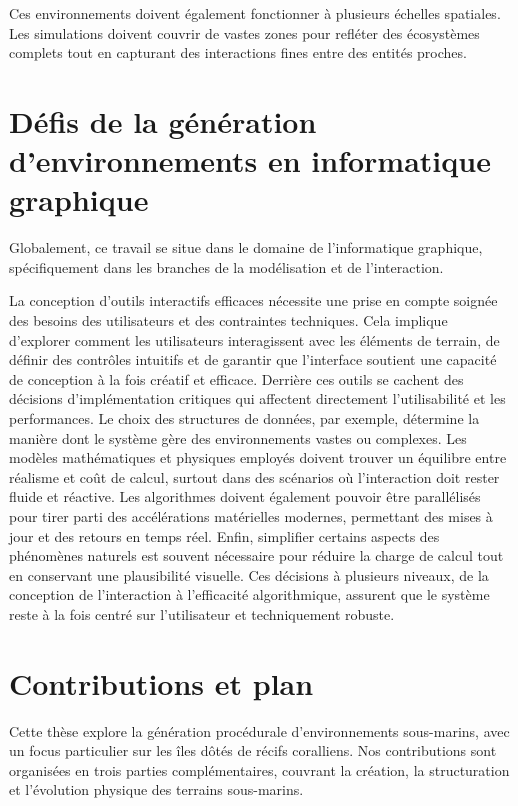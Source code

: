 Ces environnements doivent également fonctionner à plusieurs échelles spatiales. Les simulations doivent couvrir de vastes zones pour refléter des écosystèmes complets tout en capturant des interactions fines entre des entités proches.

\section*{Défis de la génération d'environnements en informatique graphique}

Globalement, ce travail se situe dans le domaine de l'informatique graphique, spécifiquement dans les branches de la modélisation et de l'interaction.

La conception d'outils interactifs efficaces nécessite une prise en compte soignée des besoins des utilisateurs et des contraintes techniques. Cela implique d'explorer comment les utilisateurs interagissent avec les éléments de terrain, de définir des contrôles intuitifs et de garantir que l'interface soutient une capacité de conception à la fois créatif et efficace. Derrière ces outils se cachent des décisions d'implémentation critiques qui affectent directement l'utilisabilité et les performances. Le choix des structures de données, par exemple, détermine la manière dont le système gère des environnements vastes ou complexes. Les modèles mathématiques et physiques employés doivent trouver un équilibre entre réalisme et coût de calcul, surtout dans des scénarios où l'interaction doit rester fluide et réactive. Les algorithmes doivent également pouvoir être parallélisés pour tirer parti des accélérations matérielles modernes, permettant des mises à jour et des retours en temps réel. Enfin, simplifier certains aspects des phénomènes naturels est souvent nécessaire pour réduire la charge de calcul tout en conservant une plausibilité visuelle. Ces décisions à plusieurs niveaux, de la conception de l'interaction à l'efficacité algorithmique, assurent que le système reste à la fois centré sur l'utilisateur et techniquement robuste.

\section*{Contributions et plan}
Cette thèse explore la génération procédurale d'environnements sous-marins, avec un focus particulier sur les îles dôtés de récifs coralliens. Nos contributions sont organisées en trois parties complémentaires, couvrant la création, la structuration et l'évolution physique des terrains sous-marins.

